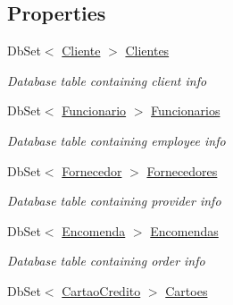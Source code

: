 \subsection*{Properties}
\begin{DoxyCompactItemize}
\item 
Db\+Set$<$ \mbox{\hyperlink{classmvc_j_j_m_s_1_1_models_1_1_cliente}{Cliente}} $>$ \mbox{\hyperlink{classmvc_j_j_m_s_1_1_data_1_1_j_j_m_s_context_af090c3e4b61638096cf0085f313a8bde}{Clientes}}
\begin{DoxyCompactList}\small\item\em Database table containing client info \end{DoxyCompactList}\item 
Db\+Set$<$ \mbox{\hyperlink{classmvc_j_j_m_s_1_1_models_1_1_funcionario}{Funcionario}} $>$ \mbox{\hyperlink{classmvc_j_j_m_s_1_1_data_1_1_j_j_m_s_context_a8bf23800fa7d55f90d47fb4e227d1fe2}{Funcionarios}}
\begin{DoxyCompactList}\small\item\em Database table containing employee info \end{DoxyCompactList}\item 
Db\+Set$<$ \mbox{\hyperlink{classmvc_j_j_m_s_1_1_models_1_1_fornecedor}{Fornecedor}} $>$ \mbox{\hyperlink{classmvc_j_j_m_s_1_1_data_1_1_j_j_m_s_context_a46f580334ca10f6fb677d92e21d0778a}{Fornecedores}}
\begin{DoxyCompactList}\small\item\em Database table containing provider info \end{DoxyCompactList}\item 
Db\+Set$<$ \mbox{\hyperlink{classmvc_j_j_m_s_1_1_models_1_1_encomenda}{Encomenda}} $>$ \mbox{\hyperlink{classmvc_j_j_m_s_1_1_data_1_1_j_j_m_s_context_ad0850c01749a0a69a17ecb59e0d2ed76}{Encomendas}}
\begin{DoxyCompactList}\small\item\em Database table containing order info \end{DoxyCompactList}\item 
Db\+Set$<$ \mbox{\hyperlink{classmvc_j_j_m_s_1_1_models_1_1_cartao_credito}{Cartao\+Credito}} $>$ \mbox{\hyperlink{classmvc_j_j_m_s_1_1_data_1_1_j_j_m_s_context_aa0df06a1a57e42ddb59661a7f8b38a61}{Cartoes}}

\end{DoxyCompactItemize}
